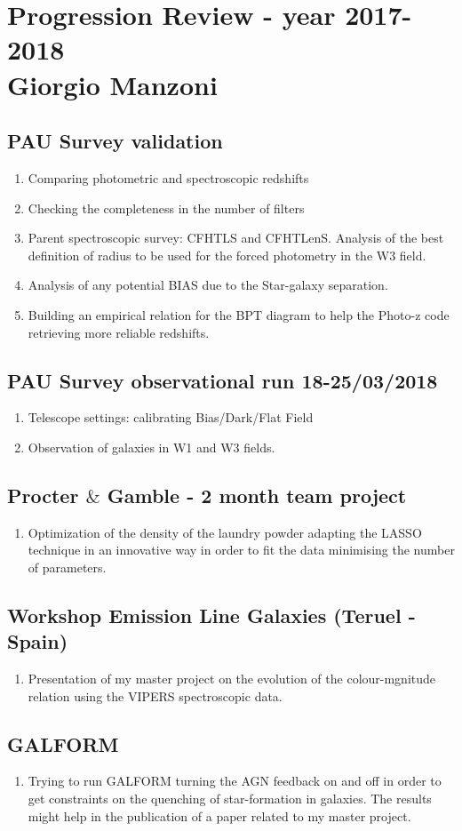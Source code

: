 \documentclass[letterpaper]{report}
\begin{document}
\chapter{Progression Review - year 2017-2018  \\ $\text{ } $ \\ Giorgio Manzoni}

\section{PAU Survey validation}
\begin{enumerate}
\item Comparing photometric and spectroscopic redshifts
\item Checking the completeness in the number of filters
\item Parent spectroscopic survey: CFHTLS and CFHTLenS. Analysis of the best definition of radius to be used for the forced photometry in the W3 field.
\item Analysis of any potential BIAS due to the Star-galaxy separation.
\item Building an empirical relation for the BPT diagram to help the Photo-z code retrieving more reliable redshifts.
\end{enumerate}

\section{PAU Survey observational run 18-25/03/2018}
\begin{enumerate}
\item Telescope settings: calibrating Bias/Dark/Flat Field
\item Observation of galaxies in W1 and W3 fields.
\end{enumerate} 

\section{Procter $\&$ Gamble - 2 month team project}
\begin{enumerate}
\item Optimization of the density of the laundry powder adapting the LASSO technique in an innovative way in order to fit the data minimising the number of parameters.
\end{enumerate}

\section{Workshop Emission Line Galaxies (Teruel - Spain)}
\begin{enumerate}
\item Presentation of my master project on the evolution of the colour-mgnitude relation using the VIPERS spectroscopic data.
\end{enumerate}

\section{GALFORM}
\begin{enumerate}
\item Trying to run GALFORM turning the AGN feedback on and off in order to get constraints on the quenching of star-formation in galaxies. The results might help in the publication of a paper related to my master project.
\end{enumerate}
\end{document}

